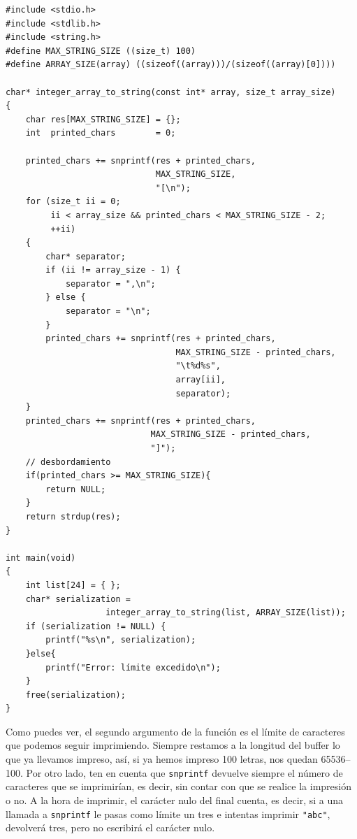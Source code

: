 \documentclass[a4paper]{article}
\begin{document}
\noindent
\begin{minipage}[H]{\linewidth}
\mbox{}
\begin{lstlisting}[style=C,
caption={Ejemplo de uso de \texttt{snprintf}},
label={lst:snprintfExample}]
#include <stdio.h>
#include <stdlib.h>
#include <string.h>
#define MAX_STRING_SIZE ((size_t) 100)
#define ARRAY_SIZE(array) ((sizeof((array)))/(sizeof((array)[0])))

char* integer_array_to_string(const int* array, size_t array_size)
{
    char res[MAX_STRING_SIZE] = {};
    int  printed_chars        = 0;

    printed_chars += snprintf(res + printed_chars,
                              MAX_STRING_SIZE,
                              "[\n");
    for (size_t ii = 0;
         ii < array_size && printed_chars < MAX_STRING_SIZE - 2;
         ++ii)
    {
        char* separator;
        if (ii != array_size - 1) {
            separator = ",\n";
        } else {
            separator = "\n";
        }
        printed_chars += snprintf(res + printed_chars,
                                  MAX_STRING_SIZE - printed_chars,
                                  "\t%d%s",
                                  array[ii],
                                  separator);
    }
    printed_chars += snprintf(res + printed_chars,
                             MAX_STRING_SIZE - printed_chars,
                             "]");
    // desbordamiento
    if(printed_chars >= MAX_STRING_SIZE){
        return NULL;
    }
    return strdup(res);
}

int main(void)
{
    int list[24] = { };
    char* serialization =
                    integer_array_to_string(list, ARRAY_SIZE(list));
    if (serialization != NULL) {
        printf("%s\n", serialization);
    }else{
        printf("Error: límite excedido\n");
    }
    free(serialization);
}
\end{lstlisting}
\end{minipage}

Como puedes ver, el segundo argumento de la función es el límite de caracteres
que podemos seguir imprimiendo. Siempre restamos a la longitud del buffer
lo que ya llevamos impreso, así, si ya hemos impreso 100 letras, nos quedan
65536--100. Por otro lado, ten en cuenta que \verb!snprintf! devuelve siempre
el número de caracteres que se imprimirían, es decir, sin contar con que se
realice la impresión o no. A la hora de imprimir, el carácter nulo del final
cuenta, es decir, si a una llamada a \verb!snprintf! le pasas como límite
un tres e intentas imprimir \verb!"abc"!, devolverá tres, pero no escribirá
el carácter nulo.
\end{document}

